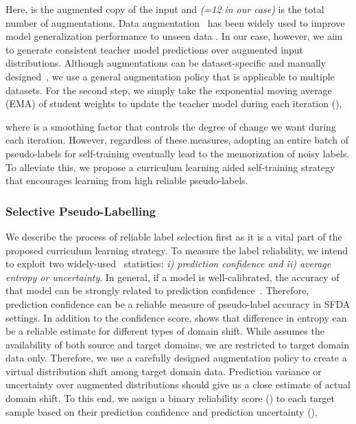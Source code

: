 \documentclass[10pt,twocolumn,letterpaper]{article}
\begin{document}
Here,  is the  augmented copy of the input  and  \emph{(=12 in our case)} is the total number of augmentations. Data augmentation~\cite{cubuk2019autoaugment} has been widely used to improve model generalization performance to unseen data \cite{shorten2019survey,krizhevsky2017imagenet}. In our case, however, we aim to generate consistent teacher model predictions over augmented input distributions.
Although augmentations can be dataset-specific and manually designed~\cite{shorten2019survey,krizhevsky2017imagenet, SHOT}, we use a general augmentation policy that is applicable to multiple datasets. For the second step, we simply take the exponential moving average (EMA) of student weights to update the teacher model during each iteration (), 

where  is a smoothing factor that controls the degree of change we want during each iteration. However, regardless of these measures, adopting an entire batch of pseudo-labels for self-training eventually lead to the memorization of noisy labels. To alleviate this, we propose a curriculum learning aided self-training strategy that encourages learning from high reliable pseudo-labels. 

\vspace{-2mm}
\subsubsection{Selective Pseudo-Labelling}
\label{sec:selection}
\vspace{-1mm}
We describe the process of reliable label selection first as it is a vital part of the proposed curriculum learning strategy. To measure the label reliability, we intend to exploit two widely-used~\cite{dong2021confident,qiao2021uncertainty,wang2021uncertainty,hubalanced} statistics: \emph{i) prediction confidence and ii) average entropy or uncertainty}. In general, if a model is well-calibrated, the accuracy of that model can be strongly related to prediction confidence~\cite{guillory2021predicting}. Therefore, prediction confidence can be a reliable measure of pseudo-label accuracy in SFDA settings. In addition to the confidence score, \cite{guillory2021predicting} shows that difference in entropy can be a reliable estimate for different types of domain shift. While \cite{guillory2021predicting} assumes the availability of both source and target domains, we are restricted to target domain data only. Therefore, we use a carefully designed augmentation policy to create a virtual distribution shift among target domain data. Prediction variance or uncertainty over augmented distributions should give us a close estimate of actual domain shift. To this end, we assign a binary reliability score () to each target sample based on their prediction confidence and prediction uncertainty (),
\end{document}
